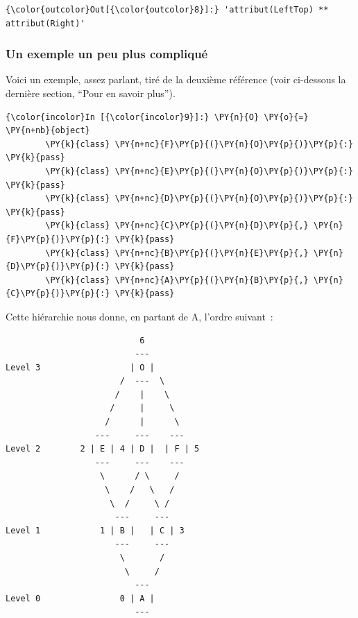\begin{Verbatim}[commandchars=\\\{\}]
{\color{outcolor}Out[{\color{outcolor}8}]:} 'attribut(LeftTop) ** attribut(Right)'
\end{Verbatim}
            
    \hypertarget{un-exemple-un-peu-plus-compliquuxe9}{%
\subsubsection{Un exemple un peu plus
compliqué}\label{un-exemple-un-peu-plus-compliquuxe9}}

    Voici un exemple, assez parlant, tiré de la deuxième référence (voir
ci-dessous la dernière section, ``Pour en savoir plus'').

    \begin{Verbatim}[commandchars=\\\{\}]
{\color{incolor}In [{\color{incolor}9}]:} \PY{n}{O} \PY{o}{=} \PY{n+nb}{object}
        \PY{k}{class} \PY{n+nc}{F}\PY{p}{(}\PY{n}{O}\PY{p}{)}\PY{p}{:} \PY{k}{pass}
        \PY{k}{class} \PY{n+nc}{E}\PY{p}{(}\PY{n}{O}\PY{p}{)}\PY{p}{:} \PY{k}{pass}
        \PY{k}{class} \PY{n+nc}{D}\PY{p}{(}\PY{n}{O}\PY{p}{)}\PY{p}{:} \PY{k}{pass}
        \PY{k}{class} \PY{n+nc}{C}\PY{p}{(}\PY{n}{D}\PY{p}{,} \PY{n}{F}\PY{p}{)}\PY{p}{:} \PY{k}{pass}
        \PY{k}{class} \PY{n+nc}{B}\PY{p}{(}\PY{n}{E}\PY{p}{,} \PY{n}{D}\PY{p}{)}\PY{p}{:} \PY{k}{pass}
        \PY{k}{class} \PY{n+nc}{A}\PY{p}{(}\PY{n}{B}\PY{p}{,} \PY{n}{C}\PY{p}{)}\PY{p}{:} \PY{k}{pass}
\end{Verbatim}


    Cette hiérarchie nous donne, en partant de A, l'ordre suivant~:

    \begin{verbatim}
                           6
                          ---
Level 3                  | O |
                       /  ---  \
                      /    |    \
                     /     |     \
                    /      |      \
                  ---     ---    ---
Level 2        2 | E | 4 | D |  | F | 5
                  ---     ---    ---
                   \      / \     /
                    \    /   \   /
                     \  /     \ /
                      ---     ---
Level 1            1 | B |   | C | 3
                      ---     ---
                       \       /
                        \     /
                          ---
Level 0                0 | A |
                          ---
\end{verbatim}

